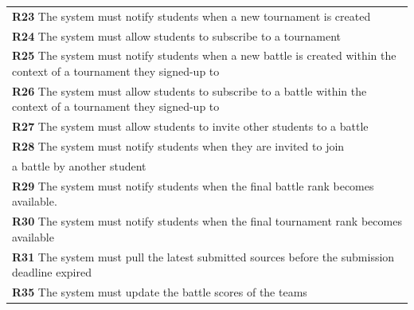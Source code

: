 \begin{table}[H]
\begin{tabularx}{\textwidth}{X}
        \textbf{R23} The system must notify students when a new tournament is created            \\ 
        \textbf{R24} The system must allow students to subscribe to a tournament     \\ 
        \textbf{R25} The system must notify students when a new battle is created within the context of a tournament they signed-up to        \\ 
        \textbf{R26} The system must allow students to subscribe to a battle  within the context of a tournament they signed-up to            \\
        \textbf{R27} The system must allow students to invite other students to a battle     \\ 
        \textbf{R28} The system must notify students when they are invited to join \\ a battle by another student        \\ 
        \textbf{R29} The system must notify students when the final battle rank becomes available.       \\ 
        \textbf{R30} The system must notify students when the final tournament rank becomes available     \\ 
        \textbf{R31} The system must pull the latest submitted sources before the submission deadline expired     \\ 
        \textbf{R35} The system must update the battle scores of the teams       \\ 
    \end{tabularx}
\end{table}

